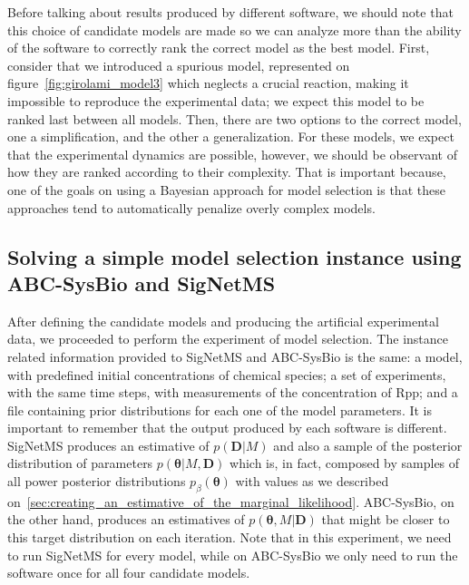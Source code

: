
Before talking about results produced by different software, we should
note that this choice of candidate models are made so we can analyze
more than the ability of the software to correctly rank the correct
model as the best model. First, consider that we introduced a spurious
model, represented on figure~\ref{fig:girolami_model3} which neglects a
crucial reaction, making it impossible to reproduce the experimental
data; we expect this model to be ranked last between all models. Then,
there are two options to the correct model, one a simplification, and
the other a generalization. For these models, we expect that the
experimental dynamics are possible, however, we should be observant of
how they are ranked according to their complexity. That is important
because, one of the goals on using a Bayesian approach for model 
selection is that these approaches tend to automatically penalize overly
complex models.

\subsection{Solving a simple model selection instance using ABC-SysBio
and SigNetMS}

After defining the candidate models and producing the artificial
experimental data, we proceeded to perform the experiment of model
selection. The instance related information provided to SigNetMS and 
ABC-SysBio is the same: a model, with predefined initial concentrations
of chemical species; a set of experiments, with the same time steps, 
with measurements of the concentration of Rpp; and a file containing
prior distributions for each one of the model parameters. It is
important to remember that the output produced by each software is
different. SigNetMS produces an estimative of $p({\bm D} | M)$ and also
a sample of the posterior distribution of parameters $p({\bm \theta} |
M, {\bm D})$ which is, in fact, composed by samples of all power
posterior distributions $p_{\beta}({\bm \theta})$ with values as we
described
on~\ref{sec:creating_an_estimative_of_the_marginal_likelihood}.
ABC-SysBio, on the other hand, produces an estimatives of $p({\bm
\theta}, M | {\bm D})$ that might be closer to this target distribution
on each iteration. Note that in this experiment, we need to run SigNetMS
for every model, while on ABC-SysBio we only need to run the software
once for all four candidate models.

